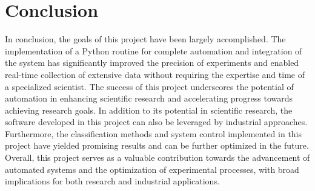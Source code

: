 \chapter{Conclusion}

In conclusion, the goals of this project have been largely accomplished. The implementation of a Python routine for complete automation and integration of the system has significantly improved the precision of experiments and enabled real-time collection of extensive data without requiring the expertise and time of a specialized scientist. The success of this project underscores the potential of automation in enhancing scientific research and accelerating progress towards achieving research goals.
In addition to its potential in scientific research, the software developed in this project can also be leveraged by industrial approaches. Furthermore, the classification methods and system control implemented in this project have yielded promising results and can be further optimized in the future. Overall, this project serves as a valuable contribution towards the advancement of automated systems and the optimization of experimental processes, with broad implications for both research and industrial applications.

\clearpage
